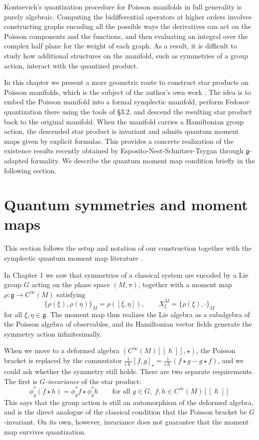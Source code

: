 \documentclass[
  12pt,
  a4paper, oneside
]{report}
\renewcommand{\hbar}{\hslash}
\theoremstyle{bolddef}
\theoremstyle{remark}
\numberwithin{equation}{chapter}
\begin{document}
Kontsevich's quantization procedure for Poisson manifolds in full generality is purely algebraic. Computing the bidifferential operators at higher orders involves constructing graphs encoding all the possible ways the derivatives can act on the Poisson components and the functions, and then evaluating an integral over the complex half plane for the weight of each graph. As a result, it is difficult to study how additional structures on the manifold, such as symmetries of a group action, interact with the quantized product.

In this chapter we present a more geometric route to construct star products on Poisson manifolds, which is the subject of the author's own work \cite{mypaper}. The idea is to embed the Poisson manifold into a formal symplectic manifold, perform Fedosov quantization there using the tools of \S 3.2, and descend the resulting star product back to the original manifold. When the manifold carries a Hamiltonian group action, the descended star product is invariant and admits quantum moment maps given by explicit formulas. This provides a concrete realization of the existence results recently obtained by Esposito-Nest-Schnitzer-Tsygan \cite{ENST} through $\mathfrak{g}$-adapted formality. We describe the quantum moment map condition briefly in the following section.


\section*{Quantum symmetries and moment maps}
This section follows the setup and notation of our construction together with the symplectic quantum moment map literature \cite{mypaper,ENST}.


In Chapter 1 we saw that symmetries of a classical system are encoded by a Lie group $G$ acting on the phase space $(M, \pi)$, together with a moment map $\rho : \mathfrak{g} \to C^\infty(M)$ satisfying
\[
\{\rho(\xi), \rho(\eta)\}_M = \rho([\xi, \eta]), \qquad X^M_\xi = \{\rho(\xi), \cdot\}_M
\]
for all $\xi, \eta \in \mathfrak{g}$. The moment map thus realizes the Lie algebra as a subalgebra of the Poisson algebra of observables, and its Hamiltonian vector fields generate the symmetry action infinitesimally.

When we move to a deformed algebra $(C^\infty(M)[[\hbar]], \star)$, the Poisson bracket is replaced by the commutator $\frac{1}{i\hbar}[f, g]_\star = \frac{1}{i\hbar}(f \star g - g \star f)$, and we could ask whether the symmetry still holds. There are two separate requirements. The first is \emph{$G$-invariance} of the star product:
\[
\phi_g^*(f \star h) = \phi_g^* f \star \phi_g^* h \qquad \text{for all } g \in G,\; f, h \in C^\infty(M)[[\hbar]]
\]
This says that the group action is still an automorphism of the deformed algebra, and is the direct analogue of the classical condition that the Poisson bracket be $G$-invariant. On its own, however, invariance does not guarantee that the moment map survives quantization.
\end{document}
